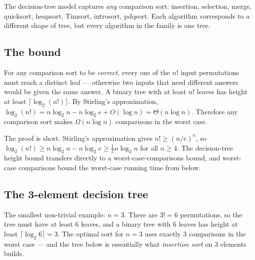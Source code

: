 \documentclass[11pt]{article}
\begin{document}
The decision-tree model captures \emph{any} comparison sort:
insertion, selection, merge, quicksort, heapsort, Timsort,
introsort, pdqsort. Each algorithm corresponds to a different
shape of tree, but every algorithm in the family is one tree.

\subsection*{The bound}

\begin{ideabox}
For any comparison sort to be \emph{correct}, every one of the $n!$
input permutations must reach a distinct leaf --- otherwise two
inputs that need different answers would be given the same answer.
A binary tree with at least $n!$ leaves has height at least
$\lceil \log_2 (n!) \rceil$. By Stirling's approximation,
$\log_2 (n!) = n \log_2 n - n \log_2 e + O(\log n) = \Theta(n \log n)$.
Therefore any comparison sort makes $\Omega(n \log n)$ comparisons
in the worst case.
\end{ideabox}

The proof is short. Stirling's approximation gives
$n! \geq (n/e)^n$, so
$\log_2(n!) \geq n \log_2 n - n \log_2 e \geq \tfrac{1}{2} n \log_2 n$
for all $n \geq 4$. The decision-tree height bound transfers
directly to a worst-case-comparisons bound, and worst-case
comparisons bound the worst-case running time from below.

\subsection*{The 3-element decision tree}

The smallest non-trivial example: $n = 3$. There are $3! = 6$
permutations, so the tree must have at least 6 leaves, and a binary
tree with 6 leaves has height at least
$\lceil \log_2 6 \rceil = 3$. The optimal sort for $n = 3$ uses
exactly 3 comparisons in the worst case --- and the tree below is
essentially what \emph{insertion sort} on 3 elements builds.
\end{document}
